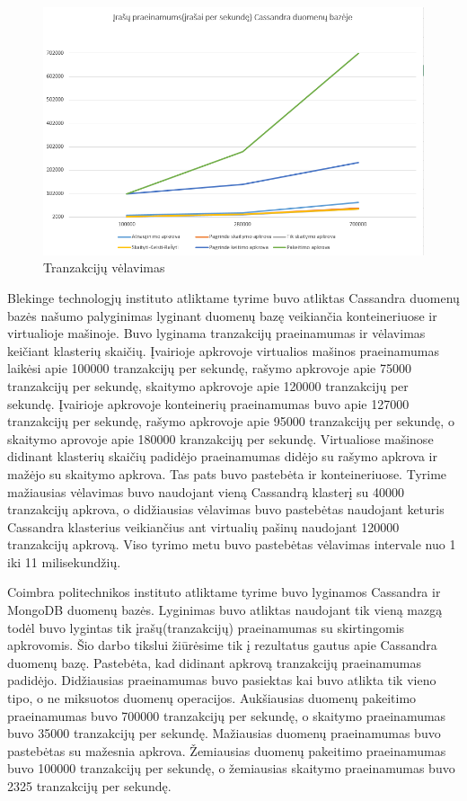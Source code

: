 \documentclass{VUMIFPSkursinis}
\begin{document}
		\begin{figure}[H]
		    \centering
		    \includegraphics[scale=0.5]{img/CasTp}
		    \caption{Tranzakcijų vėlavimas}   %
		    \label{img:mlp}
		\end{figure}
 			Blekinge technologjų instituto atliktame tyrime \cite{BITCass} buvo atliktas Cassandra duomenų bazės našumo palyginimas lyginant duomenų bazę  veikiančia konteineriuose ir virtualioje mašinoje. Buvo lyginama tranzakcijų praeinamumas ir vėlavimas keičiant klasterių skaičių. Įvairioje apkrovoje virtualios mašinos praeinamumas laikėsi apie 100000 tranzakcijų per sekundę, rašymo apkrovoje apie 75000 tranzakcijų per sekundę, skaitymo apkrovoje apie 120000 tranzakcijų per sekundę.
Įvairioje apkrovoje konteinerių praeinamumas buvo apie 127000 tranzakcijų per sekundę, rašymo apkrovoje apie 95000 tranzakcijų per sekundę, o skaitymo aprovoje apie 180000 kranzakcijų per sekundę. Virtualiose mašinose didinant klasterių skaičių padidėjo praeinamumas didėjo su rašymo apkrova ir mažėjo su skaitymo apkrova. Tas pats buvo pastebėta ir konteineriuose.
\newline
Tyrime mažiausias vėlavimas buvo naudojant vieną Cassandrą klasterį su 40000 tranzakcijų apkrova, o didžiausias vėlavimas buvo pastebėtas naudojant keturis Cassandra klasterius veikiančius ant virtualių pašinų naudojant 120000 tranzakcijų apkrovą. 
Viso tyrimo metu buvo pastebėtas vėlavimas intervale nuo 1 iki 11 milisekundžių.
			
			Coimbra politechnikos instituto atliktame tyrime \cite{MonCas} buvo lyginamos Cassandra ir MongoDB duomenų bazės. 
Lyginimas buvo atliktas naudojant tik vieną mazgą todėl buvo lygintas tik įrašų(tranzakcijų) praeinamumas su skirtingomis apkrovomis. 
Šio darbo tikslui žiūrėsime tik į rezultatus gautus apie Cassandra duomenų bazę. Pastebėta, kad didinant apkrovą tranzakcijų praeinamumas padidėjo. 
Didžiausias praeinamumas buvo pasiektas kai buvo atlikta tik vieno tipo, o ne miksuotos duomenų operacijos.
Aukšiausias duomenų pakeitimo praeinamumas buvo 700000 tranzakcijų per sekundę, o skaitymo praeinamumas buvo 35000 tranzakcijų per sekundę.
Mažiausias duomenų praeinamumas buvo pastebėtas su mažesnia apkrova.
Žemiausias duomenų pakeitimo praeinamumas buvo 100000 tranzakcijų per sekundę, o žemiausias skaitymo praeinamumas buvo 2325 tranzakcijų per sekundę.
\end{document}
